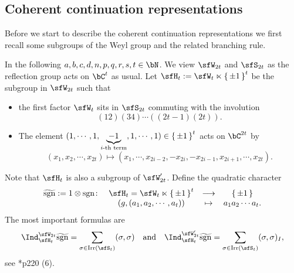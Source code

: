 \documentclass[12pt,a4paper]{amsart}
\newcommand{\sgn}{\operatorname{sgn}}
\numberwithin{equation}{section}
\theoremstyle{remark}
\def\Irr{\mathrm{Irr}}
\def\AND{\quad \text{and} \quad}
\def\hsgn{\widetilde{\mathrm{sgn}}}
\begin{document}
\subsection{Coherent continuation representations}


Before we start to describe the coherent continuation representations we first
recall some subgroups of the Weyl group and the related branching rule.


In the following $a,b,c,d,n,p,q,r,s,t\in \bN$. We view $\sfW_{2t}$ and
$\sfS_{2t}$ as the reflection group acts on $\bC^{t}$ as usual. Let
$\sfH_{t} := \sfW_t\ltimes \set{\pm 1}^t$ be the subgroup in $\sfW_{2t}$ such
that
\begin{itemize}
  \item the first factor $\sfW_{t}$ sits in $\sfS_{2t}$ commuting with the
        involution
        \[
        (12)(34)\cdots ((2t-1)(2t)).
        \]
  \item The element $(1,\cdots,1, \underbrace{-1}_{i\text{-th
        term}}, 1, \cdots, 1)\in \set{\pm 1}^{t}$ acts on $\bC^{2t}$ by
        \[
        (x_{1},x_{2},\cdots, x_{2t} ) \mapsto (x_{1},\cdots, x_{2i-2}, -x_{2i},-x_{2i-1},x_{2i+1},\cdots, x_{2t}).
        \]
\end{itemize}
Note that $\sfH_{t}$ is also a subgroup of $\sfW'_{2t}$. Define the quadratic
character
\[
  \begin{array}{rccc}
    \hsgn := 1\otimes \sgn\colon & \sfH_{t}=  \sfW_{t}\ltimes \set{\pm 1}^{t}& \longrightarrow & \set{\pm 1}\\
                                 & (g,(a_{1},a_{2},\cdots, a_{t})) & \mapsto & a_{1}a_{2}\cdots a_{t}.
  \end{array}
\]
The most important formulas are
\begin{equation}\label{eq:CC.C}
  \Ind_{\sfH_{t}}^{\sfW_{2t}} \hsgn = \sum_{\sigma\in \Irr(\sfS_{t})} (\sigma,\sigma)
  \AND
  \Ind_{\sfH_{t}}^{\sfW'_{2t}} \hsgn = \sum_{\sigma\in \Irr(\sfS_{t})} (\sigma,\sigma)_{I},
\end{equation}
see \cite{Mc}*{p220 (6)}.
\end{document}
